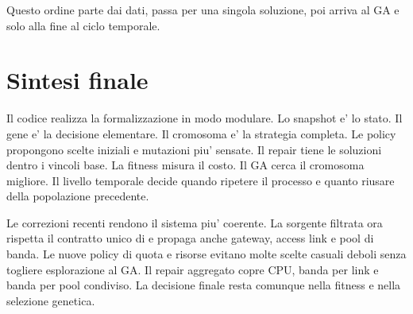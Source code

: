 \documentclass[11pt,a4paper]{article}
\newcommand{\code}[1]{\texttt{\detokenize{#1}}}
\newcommand{\cls}[1]{\code{#1}}
\begin{document}
Questo ordine parte dai dati, passa per una singola soluzione, poi arriva al GA
e solo alla fine al ciclo temporale.

\section{Sintesi finale}

Il codice realizza la formalizzazione in modo modulare. Lo snapshot e' lo stato.
Il gene e' la decisione elementare. Il cromosoma e' la strategia completa. Le
policy propongono scelte iniziali e mutazioni piu' sensate. Il repair tiene le
soluzioni dentro i vincoli base. La fitness misura il costo. Il GA cerca il
cromosoma migliore. Il livello temporale decide quando ripetere il processo e
quanto riusare della popolazione precedente.

Le correzioni recenti rendono il sistema piu' coerente. La sorgente filtrata ora
rispetta il contratto unico di \cls{SystemStateSource} e propaga anche gateway,
access link e pool di banda. Le nuove policy di quota e risorse evitano molte
scelte casuali deboli senza togliere esplorazione al GA. Il repair aggregato
copre CPU, banda per link e banda per pool condiviso.
La decisione finale resta comunque nella fitness e nella selezione genetica.
\end{document}
